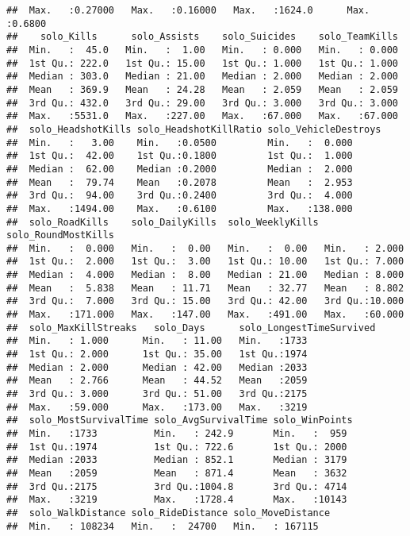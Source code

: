 \documentclass[]{article}
\begin{document}
\begin{verbatim}
##  Max.   :0.27000   Max.   :0.16000   Max.   :1624.0      Max.   :0.6800  
##    solo_Kills      solo_Assists    solo_Suicides    solo_TeamKills  
##  Min.   :  45.0   Min.   :  1.00   Min.   : 0.000   Min.   : 0.000  
##  1st Qu.: 222.0   1st Qu.: 15.00   1st Qu.: 1.000   1st Qu.: 1.000  
##  Median : 303.0   Median : 21.00   Median : 2.000   Median : 2.000  
##  Mean   : 369.9   Mean   : 24.28   Mean   : 2.059   Mean   : 2.059  
##  3rd Qu.: 432.0   3rd Qu.: 29.00   3rd Qu.: 3.000   3rd Qu.: 3.000  
##  Max.   :5531.0   Max.   :227.00   Max.   :67.000   Max.   :67.000  
##  solo_HeadshotKills solo_HeadshotKillRatio solo_VehicleDestroys
##  Min.   :   3.00    Min.   :0.0500         Min.   :  0.000     
##  1st Qu.:  42.00    1st Qu.:0.1800         1st Qu.:  1.000     
##  Median :  62.00    Median :0.2000         Median :  2.000     
##  Mean   :  79.74    Mean   :0.2078         Mean   :  2.953     
##  3rd Qu.:  94.00    3rd Qu.:0.2400         3rd Qu.:  4.000     
##  Max.   :1494.00    Max.   :0.6100         Max.   :138.000     
##  solo_RoadKills    solo_DailyKills  solo_WeeklyKills solo_RoundMostKills
##  Min.   :  0.000   Min.   :  0.00   Min.   :  0.00   Min.   : 2.000     
##  1st Qu.:  2.000   1st Qu.:  3.00   1st Qu.: 10.00   1st Qu.: 7.000     
##  Median :  4.000   Median :  8.00   Median : 21.00   Median : 8.000     
##  Mean   :  5.838   Mean   : 11.71   Mean   : 32.77   Mean   : 8.802     
##  3rd Qu.:  7.000   3rd Qu.: 15.00   3rd Qu.: 42.00   3rd Qu.:10.000     
##  Max.   :171.000   Max.   :147.00   Max.   :491.00   Max.   :60.000     
##  solo_MaxKillStreaks   solo_Days      solo_LongestTimeSurvived
##  Min.   : 1.000      Min.   : 11.00   Min.   :1733            
##  1st Qu.: 2.000      1st Qu.: 35.00   1st Qu.:1974            
##  Median : 2.000      Median : 42.00   Median :2033            
##  Mean   : 2.766      Mean   : 44.52   Mean   :2059            
##  3rd Qu.: 3.000      3rd Qu.: 51.00   3rd Qu.:2175            
##  Max.   :59.000      Max.   :173.00   Max.   :3219            
##  solo_MostSurvivalTime solo_AvgSurvivalTime solo_WinPoints 
##  Min.   :1733          Min.   : 242.9       Min.   :  959  
##  1st Qu.:1974          1st Qu.: 722.6       1st Qu.: 2000  
##  Median :2033          Median : 852.1       Median : 3179  
##  Mean   :2059          Mean   : 871.4       Mean   : 3632  
##  3rd Qu.:2175          3rd Qu.:1004.8       3rd Qu.: 4714  
##  Max.   :3219          Max.   :1728.4       Max.   :10143  
##  solo_WalkDistance solo_RideDistance solo_MoveDistance
##  Min.   : 108234   Min.   :  24700   Min.   : 167115  

\end{verbatim}
\end{document}
